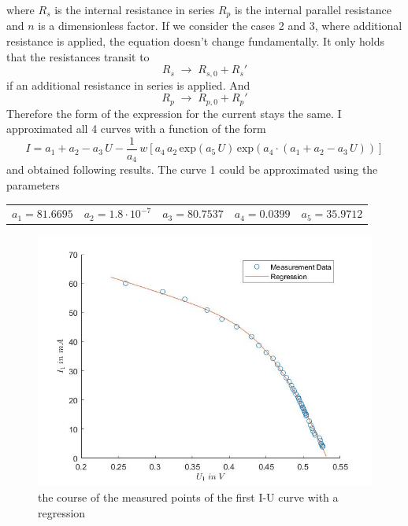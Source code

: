 \documentclass[a4paper, 12pt]{scrartcl}
\begin{document}
where $R_s$ is the internal resistance in series $R_p$ is the internal parallel resistance and $n$ is a dimensionless factor. If we consider the cases 2 and 3, where additional resistance is applied, the equation doesn't change fundamentally. It only holds that the resistances transit to
\begin{equation*}R_s\;\rightarrow\;R_{s,0}+R_{s}'\end{equation*}
if an additional resistance in series is applied. And
\begin{equation*}R_p\;\rightarrow\;R_{p,0}+R_{p}'\end{equation*}
Therefore the form of the expression for the current stays the same.\newline
I approximated all 4 curves with a function of the form
\begin{equation*}I=a_1+a_2-a_3\,U-\frac{1}{a_4}\,w\left[a_4\,a_2\,\text{exp}(a_5\,U)\,\text{exp}\left(a_4\cdot(a_1+a_2-a_3\,U)\right)\right]\end{equation*}
and obtained following results.\newline\newline\newpage
The curve 1 could be approximated using the parameters\newline\newline
\begin{tabular}{ccccc}$a_1=81.6695$&$a_2=1.8\cdot10^{-7}$&$a_3=80.7537$&$a_4=0.0399$&$a_5=35.9712$\end{tabular}
\begin{figure}[H]\includegraphics[scale=0.4]{gef. KL 1}\caption{the course of the measured points of the first I-U curve with a regression}\end{figure}
\end{document}
